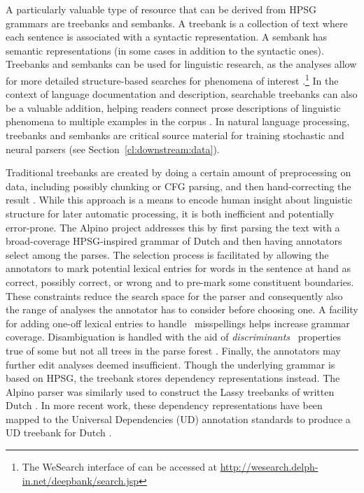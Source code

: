 \documentclass[output=paper,nonflat]{langsci/langscibook}
\begin{document}
A particularly valuable type of resource that can be derived from HPSG
grammars are treebanks and sembanks. A treebank is a collection of
text where each sentence is associated with a syntactic
representation. A sembank has semantic representations (in some cases
in addition to the syntactic ones). Treebanks and sembanks can be used
for linguistic research, as the analyses allow for more detailed
structure-based searches for phenomena of interest \citep{Rohde:05,Gho:Bir:10,Kou:Oep:14}.\footnote{The WeSearch interface of \citet{Kou:Oep:14} can be accessed at \url{http://wesearch.delph-in.net/deepbank/search.jsp}}
In the context of language documentation and description, searchable
treebanks can also be a valuable addition, helping readers connect
prose descriptions of linguistic phenomena to multiple examples in the
corpus \citep{Ben:Gho:Bal:Dri:12}. In natural language processing,
treebanks and sembanks are critical source material for training
stochastic and neural parsers (see Section~\ref{cl:downstream:data}).

Traditional treebanks are created by doing a certain amount of
preprocessing on data, including possibly chunking or CFG parsing, and
then hand-correcting the result \citep{Mar:San:Mar:93,Ban:Bon:Cai:13}.
While this approach is a means to encode human insight about
linguistic structure for later automatic processing, it is both
inefficient and potentially error-prone. The Alpino project
\citep{vanderbeek2002alpino} addresses this by first parsing the text
with a broad-coverage HPSG-inspired grammar of Dutch and then having
annotators select among the parses. The selection process is
facilitated by allowing the annotators to mark potential lexical
entries for words in the sentence at hand as correct, possibly
correct, or wrong and to pre-mark some constituent boundaries. These
constraints reduce the search space for the parser and consequently
also the range of analyses the annotator has to consider before
choosing one. A facility for adding one-off lexical entries to handle
\eg\ misspellings helps increase grammar coverage.  Disambiguation is
handled with the aid of \emph{discriminants} \ie\ properties true of
some but not all trees in the parse forest \citep{Carter:97}. Finally,
the annotators may further edit analyses deemed insufficient. Though
the underlying grammar is based on HPSG, the treebank stores
dependency representations instead.  The Alpino parser was similarly
used to construct the Lassy treebanks of written Dutch
\citep{van:bou:van:13}.  In more recent work, these dependency
representations have been mapped to the Universal Dependencies (UD)
annotation standards \citep{Niv:Mar:Gin:16} to produce a UD treebank
for Dutch \citep{Bou:Van:17}.
\end{document}
